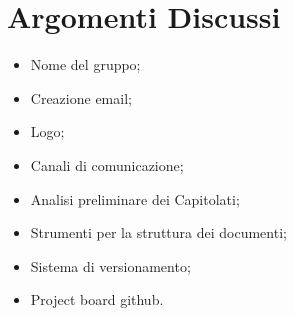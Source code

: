 \section{Argomenti Discussi}
	\begin{itemize}
		\item Nome del gruppo;
		\item Creazione email;
		\item Logo;
		\item Canali di comunicazione;
		\item Analisi preliminare dei Capitolati\glos;
		\item Strumenti per la struttura dei documenti;
		\item Sistema di versionamento;
		\item Project board github.
	\end{itemize}
